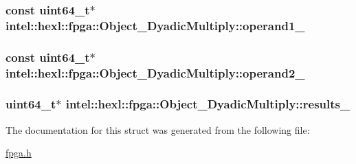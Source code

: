 \hypertarget{structintel_1_1hexl_1_1fpga_1_1Object__DyadicMultiply_af4fecd5061fed1e44ff810d214d9bd73}{
\subsubsection[{operand1\-\_\-}]{\setlength{\rightskip}{0pt plus 5cm}const uint64\-\_\-t$\ast$ intel\-::hexl\-::fpga\-::\-Object\-\_\-\-Dyadic\-Multiply\-::operand1\-\_\-}}\label{structintel_1_1hexl_1_1fpga_1_1Object__DyadicMultiply_af4fecd5061fed1e44ff810d214d9bd73}
\hypertarget{structintel_1_1hexl_1_1fpga_1_1Object__DyadicMultiply_a6593688f27a8830c1bb8ce0918db40cd}{
\subsubsection[{operand2\-\_\-}]{\setlength{\rightskip}{0pt plus 5cm}const uint64\-\_\-t$\ast$ intel\-::hexl\-::fpga\-::\-Object\-\_\-\-Dyadic\-Multiply\-::operand2\-\_\-}}\label{structintel_1_1hexl_1_1fpga_1_1Object__DyadicMultiply_a6593688f27a8830c1bb8ce0918db40cd}
\hypertarget{structintel_1_1hexl_1_1fpga_1_1Object__DyadicMultiply_a89aa54444543557280ff1ebcd250a605}{
\subsubsection[{results\-\_\-}]{\setlength{\rightskip}{0pt plus 5cm}uint64\-\_\-t$\ast$ intel\-::hexl\-::fpga\-::\-Object\-\_\-\-Dyadic\-Multiply\-::results\-\_\-}}\label{structintel_1_1hexl_1_1fpga_1_1Object__DyadicMultiply_a89aa54444543557280ff1ebcd250a605}


The documentation for this struct was generated from the following file\-:\begin{DoxyCompactItemize}
\item 
\hyperlink{fpga_8h}{fpga.\-h}\end{DoxyCompactItemize}

